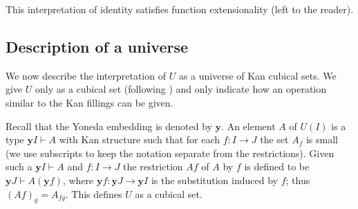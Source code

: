 \documentclass[10pt,a4paper]{article}
\newcommand{\CC}{{\mathcal C}}
\newcommand{\rup}[1]{#1{\uparrow}}
\newcommand{\rdo}[1]{#1{\downarrow}}
\newcommand{\OO}{O}
\newcommand{\yoneda}{\mathbf{y}}
\begin{document}
\medskip

This interpretation of identity satisfies function extensionality
(left to the reader).


\subsection{Description of a universe}



We now describe the interpretation of $U$ as a universe of Kan cubical
sets.  We give $U$ only as a cubical set (following
\cite{HofmannStreicher}) and only indicate how an operation similar to
the Kan fillings can be given.

Recall that the Yoneda embedding is denoted by $\yoneda$.  An
element $A$ of $U(I)$ is a type $\yoneda I \vdash A$ with Kan
structure such that for each $f \colon I \to J$ the set $A_f$ is small
(we use subscripts to keep the notation separate from the
restrictions).  Given such a $\yoneda I \vdash A$ and $f \colon I \to
J$ the restriction $A f$ of $A$ by $f$ is defined to be $\yoneda J
\vdash A (\yoneda f)$, where $\yoneda f \colon \yoneda J \to \yoneda
I$ is the substitution induced by $f$; thus $(A f)_g = A_{f g}$.  This
defines $U$ as a cubical set.

\end{document}
